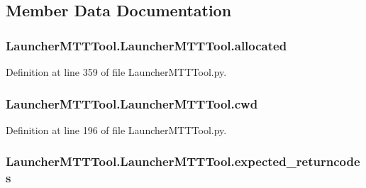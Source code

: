 \subsection{Member Data Documentation}
\hypertarget{class_launcher_m_t_t_tool_1_1_launcher_m_t_t_tool_a79266b94da58ec136cca44c1f735d3a7}{
\subsubsection[{allocated}]{\setlength{\rightskip}{0pt plus 5cm}Launcher\-M\-T\-T\-Tool.\-Launcher\-M\-T\-T\-Tool.\-allocated}}\label{class_launcher_m_t_t_tool_1_1_launcher_m_t_t_tool_a79266b94da58ec136cca44c1f735d3a7}


Definition at line 359 of file Launcher\-M\-T\-T\-Tool.\-py.

\hypertarget{class_launcher_m_t_t_tool_1_1_launcher_m_t_t_tool_a7bcf1056b03f3777ef4ed39f7e063f36}{
\subsubsection[{cwd}]{\setlength{\rightskip}{0pt plus 5cm}Launcher\-M\-T\-T\-Tool.\-Launcher\-M\-T\-T\-Tool.\-cwd}}\label{class_launcher_m_t_t_tool_1_1_launcher_m_t_t_tool_a7bcf1056b03f3777ef4ed39f7e063f36}


Definition at line 196 of file Launcher\-M\-T\-T\-Tool.\-py.

\hypertarget{class_launcher_m_t_t_tool_1_1_launcher_m_t_t_tool_ae68abb344ae827a5ce0ee79446020c63}{
\subsubsection[{expected\-\_\-returncodes}]{\setlength{\rightskip}{0pt plus 5cm}Launcher\-M\-T\-T\-Tool.\-Launcher\-M\-T\-T\-Tool.\-expected\-\_\-returncodes}}\label{class_launcher_m_t_t_tool_1_1_launcher_m_t_t_tool_ae68abb344ae827a5ce0ee79446020c63}


